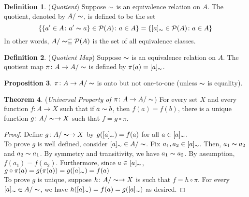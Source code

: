 \documentclass[14pt]{article}
\theoremstyle{definition}
\newtheorem{definition}{Definition}[subsection]
\newtheorem{proposition}[definition]{Proposition}
\newtheorem{theorem}[definition]{Theorem}
\begin{document}
\vspace{2mm}


\begin{definition}
    (\textit{Quotient}) Suppose $\thicksim$ is an equivalence relation on $A$. The quotient, denoted by $A/\thicksim$, is defined to be the set
    \begin{equation*}
        \{\{a'\in A\colon a'\thicksim a\}\in \mathcal{P}(A)\colon a\in A\}=\{[a]_{\thicksim}\in \mathcal{P}(A)\colon a\in A\}
    \end{equation*}
    In other words,  $A/\thicksim \subseteq \mathcal{P}(A) $ is the set of all equivalence classes.
\end{definition}

\vspace{2mm}

\begin{definition}
    (\textit{Quotient Map}) Suppose $\thicksim$ is an equivalence relation on $A$. The quotient map $\pi \colon A\rightarrow A/\thicksim$ is defined by $\pi(a)=[a]_{\thicksim}$.
\end{definition}

\vspace{2mm}
    
\begin{proposition}
    $\pi \colon A\rightarrow A/\thicksim$ is onto but not one-to-one (unless $\thicksim$ is equality).
\end{proposition}

\vspace{2mm}

\begin{theorem}
    (\textit{Universal Property of $\pi \colon A\rightarrow A/\thicksim$}) For every set $X$ and every function $f\colon A \rightarrow X$ such that if $a\thicksim b$, then $f(a)=f(b)$, there is a unique function $g\colon A/\thicksim \rightarrow X$ such that $f=g\circ \pi$.
\end{theorem}

\begin{proof}
    Define $g\colon A/\thicksim \rightarrow X$ by $g([a]_{\thicksim})=f(a)$ for all $a \in [a]_{\thicksim}$.\\
    To prove $g$ is well defined, consider $[a]_{\thicksim}\in A/\thicksim$. 
    Fix $a_1, a_2\in [a]_{\thicksim} $. Then, $a_1\thicksim a_2$ and 
    $a_2\thicksim a_1$. By symmetry and transitivity, we have $a_1\thicksim a_2$.
    By assumption, $f(a_1)=f(a_2)$. Furthermore, since $a\in [a]_\thicksim$, 
    $g\circ \pi(a)=g(\pi(a))=g([a]_\thicksim)=f(a)$\\
    To prove $g$ is unique, suppose $h\colon A/\thicksim \rightarrow X$ is 
    such that $f=h\circ \pi$.  For every $[a]_{\thicksim}\in A/\thicksim$, 
    we have $h([a]_{\thicksim})=f(a)=g([a]_{\thicksim})$ as desired.
\end{proof}
\end{document}
